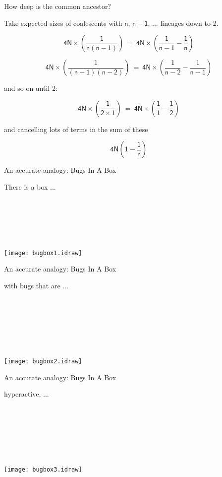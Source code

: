 \documentclass[bluish,slideColor,colorBG,pdf]{prosper}
\begin{document}
\begin{slide}[Replace]{How deep is the common ancestor? }
\bigskip

Take expected sizes of coalescents with $\mathsf{n}$, $\mathsf{n-1}$, ... lineages down to 2.
\bigskip

\[
\mathsf{4N \times \left(\frac{1}{n(n-1)} \right) \ = \ 4N \times \left(\frac{1}{n-1} -
\frac{1}{n}\right)}
\]

\[
\mathsf{4N \times \left(\frac{1}{(n-1)(n-2)} \right) \ = \ 4N \times \left(\frac{1}{n-2} -
\frac{1}{n-1}\right)}
\]

\noindent
and so on until 2:

\[
\mathsf{4N \times \left(\frac{1}{2 \times 1} \right) \ = \ 4N \times \left(\frac{1}{1} -
\frac{1}{2}\right)}
\]

\noindent
and cancelling lots of terms in the sum of these

\[
\mathsf{4N \left(1 - \frac{1}{n}\right)}
\]

\end{slide}

\begin{slide}[Replace]{An accurate analogy: Bugs In A Box}

\parbox[b]{1.5in}{There is a box ... \\ \\ \\ \\ \\ \\ } \hspace{0.3in}
\texttt{[image: bugbox1.idraw]}

\end{slide}

\begin{slide}[Replace]{An accurate analogy: Bugs In A Box}

\parbox[b]{1.5in}{with bugs that are ...\\ \\ \\ \\ \\ \\ \\ } \hspace{0.3in}
\texttt{[image: bugbox2.idraw]}

\end{slide}

\begin{slide}[Replace]{An accurate analogy: Bugs In A Box}

\parbox[b]{1.5in}{hyperactive, ...\\ \\ \\ \\ \\ \\ \\ } \hspace{0.3in}
\texttt{[image: bugbox3.idraw]}

\end{slide}
\end{document}
